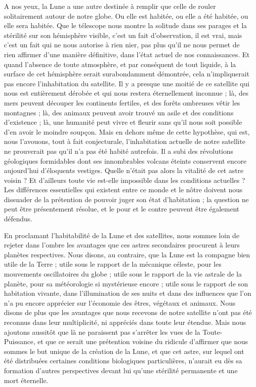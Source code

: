 \documentclass[a4paper, 11pt, oneside, landscape]{article}
\begin{document}
A nos yeux, la Lune a une autre destinée à remplir que celle de rouler solitairement autour de notre globe. Ou elle est habitée, ou elle a été habitée, ou elle sera habitée. Que le télescope nous montre la solitude dans ses parages et la stérilité sur son hémisphère visible, c'est un fait d'observation, il est vrai, mais c'est un fait qui ne nous autorise à rien nier, pas plus qu'il ne nous permet de rien affirmer d'une manière définitive, dans l'état actuel de nos connaissances. Et quand l'absence de toute atmosphère, et par conséquent de tout liquide, à la surface de cet hémisphère serait surabondamment démontrée, cela n'impliquerait pas encore l'inhabitation du satellite. Il y a presque une moitié de ce satellite qui nous est entièrement dérobée et qui nous restera éternellement inconnue ; là, des mers peuvent découper les continents fertiles, et des forêts ombreuses vêtir les montagnes ; là, des animaux peuvent avoir trouvé un asile et des conditions d'existence ; là, une humanité peut vivre et fleurir sans qu'il nous soit possible d'en avoir le moindre soupçon. Mais en dehors même de cette hypothèse, qui est, nous l'avouons, tout à fait conjecturale, l'inhabitation actuelle de notre satellite ne prouverait pas qu'il n'a pas été habité autrefois. Il a subi des révolutions géologiques formidables dont ses innombrables volcans éteints conservent encore aujourd'hui d'éloquents vestiges. Quelle n'était pas alors la vitalité de cet astre voisin ? Et d'ailleurs toute vie est-elle impossible dans les conditions actuelles ? Les différences essentielles qui existent entre ce monde et le nôtre doivent nous dissuader de la prétention de pouvoir juger son état d'habitation ; la question ne peut être présentement résolue, et le pour et le contre peuvent être également défendus.

En proclamant l'habitabilité de la Lune et des satellites, nous sommes loin de rejeter dans l'ombre les avantages que ces astres secondaires procurent à leurs planètes respectives. Nous disons, au contraire, que la Lune est la compagne bien utile de la Terre ; utile sous le rapport de la mécanique céleste, pour les mouvements oscillatoires du globe ; utile sous le rapport de la vie astrale de la planète, pour sa météorologie si mystérieuse encore ; utile sous le rapport de son habitation vivante, dans l'illumination de ses nuits et dans des influences que l'on n'a pu encore apprécier sur l'économie des êtres, végétaux et animaux. Nous disons de plus que les avantages que nous recevons de notre satellite n'ont pas été reconnus dans leur multiplicité, ni appréciés dans toute leur étendue. Mais nous ajoutons aussitôt que là ne paraissent pas s'arrêter les vues de la Toute-Puissance, et que ce serait une prétention voisine du ridicule d'affirmer que nous sommes le but unique de la création de la Lune, et que cet astre, sur lequel ont été distribuées certaines conditions biologiques particulières, n'aurait eu dès sa formation d'autres perspectives devant lui qu'une stérilité permanente et une mort éternelle.
\end{document}

